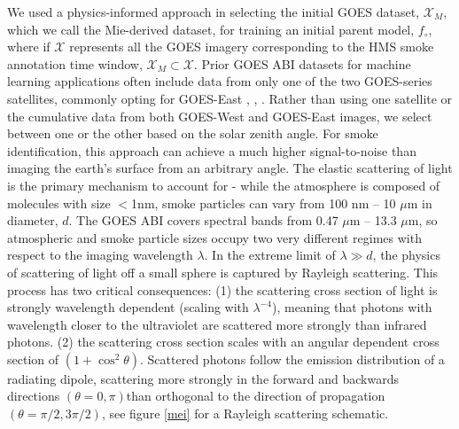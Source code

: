 \documentclass{article}
\begin{document}
We used a physics-informed approach in selecting the initial GOES dataset, \(\mathcal{X}_M\), which we call the Mie-derived dataset, for training an initial parent model, \(f_{\circ}\), where if \(\mathcal{X}\) represents all the GOES imagery corresponding to the HMS smoke annotation time window, \(\mathcal{X}_M \subset \mathcal{X}\). Prior GOES ABI datasets for machine learning applications often include data from only one of the two GOES-series satellites, commonly opting for GOES-East \cite{smoke_goes}, \cite{wildfire_detect}, \cite{goes_conv}. Rather than using one satellite or the cumulative data from both GOES-West and GOES-East images, we select between one or the other based on the solar zenith angle. For smoke identification, this approach can achieve a much higher signal-to-noise than imaging the earth’s surface from an arbitrary angle. The elastic scattering of light is the primary mechanism to account for - while the atmosphere is composed of molecules with size \(<\)1nm, smoke particles can vary from 100 nm -- 10 \(\mu\)m in diameter, \(d\). The GOES ABI covers spectral bands from 0.47 \(\mu\)m -- 13.3 \(\mu\)m, so atmospheric and smoke particle sizes occupy two very different regimes with respect to the imaging wavelength \(\lambda\). In the extreme limit of \(\lambda \gg d\), the physics of scattering of light off a small sphere is captured by Rayleigh scattering. This process has two critical consequences: (1) the scattering cross section of light is strongly wavelength dependent (scaling with \(\lambda^{-4}\)), meaning that photons with wavelength closer to the ultraviolet are scattered more strongly than infrared photons. (2) the scattering cross section scales with an angular dependent cross section of \((1 + \cos^2 \theta)\). Scattered photons follow the emission distribution of a radiating dipole, scattering more strongly in the forward and backwards directions \((\theta = 0,\pi)\)than orthogonal to the direction of propagation \((\theta = \pi/2, 3\pi/2)\), see figure \ref{mei} for a Rayleigh scattering schematic.

\end{document}
